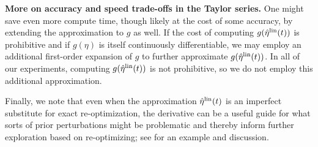 \noindent \textbf{More on accuracy and speed trade-offs in the Taylor series.}
One might save even more compute time, though likely at the cost of some
accuracy, by extending the approximation to $g$ as well. If the cost of
computing $g(\hat\eta^{\mathrm{lin}}(t))$ is prohibitive and if $g(\eta)$ is itself continuously
differentiable, we may employ an additional first-order expansion of $g$ to
further approximate $g(\hat\eta^{\mathrm{lin}}(t))$. In all of our experiments, computing
$g(\hat\eta^{\mathrm{lin}}(t))$ is not prohibitive, so we do not employ this additional
approximation.

Finally, we note that even when the approximation $\hat\eta^{\mathrm{lin}}(t)$ is an imperfect
substitute for exact re-optimization, the derivative can be a useful guide for
what sorts of prior perturbations might be problematic and thereby inform
further exploration based on re-optimizing; see  for
an example and discussion.
